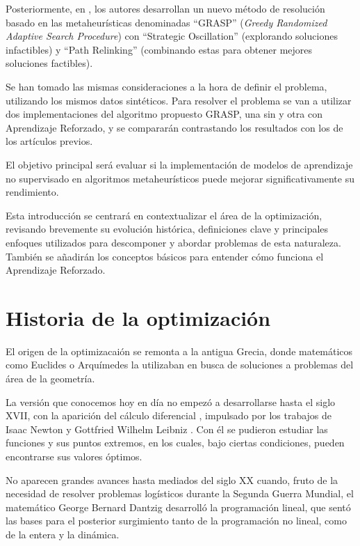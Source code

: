\documentclass[12pt,a4paper]{book}
\begin{document}
Posteriormente, en \cite{k-Balanced_2}, los autores desarrollan un nuevo método de resolución basado en las metaheurísticas denominadas ``GRASP'' \cite{GRASP} (\textit{Greedy Randomized Adaptive Search Procedure}) con ``Strategic Oscillation'' \cite{oscillation} (explorando soluciones infactibles) y ``Path Relinking'' \cite{path_relinking} (combinando estas para obtener mejores soluciones factibles).

Se han tomado las mismas consideraciones a la hora de definir el problema, utilizando los mismos datos sintéticos.
Para resolver el problema se van a utilizar dos implementaciones del algoritmo propuesto GRASP, una sin y otra con Aprendizaje Reforzado, y se compararán contrastando los resultados con los de los artículos previos.

El objetivo principal será evaluar si la implementación de modelos de aprendizaje no supervisado en algoritmos metaheurísticos puede mejorar significativamente su rendimiento.

Esta introducción se centrará en contextualizar el área de la optimización, revisando brevemente su evolución histórica, definiciones clave y principales enfoques utilizados para descomponer y abordar problemas de esta naturaleza. También se añadirán los conceptos básicos para entender cómo funciona el Aprendizaje Reforzado.


\section{Historia de la optimización}
El origen de la optimizacaión se remonta a la antigua Grecia, donde matemáticos como Euclides o Arquímedes la utilizaban en busca de soluciones a problemas del área de la geometría.

La versión que conocemos hoy en día no empezó a desarrollarse hasta el siglo XVII, con la aparición del cálculo diferencial \cite{calculo_diferencial}, impulsado por los trabajos de Isaac Newton y Gottfried Wilhelm Leibniz \cite{Leibniz}. Con él se pudieron estudiar las funciones y sus puntos extremos,
en los cuales, bajo ciertas condiciones, pueden encontrarse sus valores óptimos.

No aparecen grandes avances hasta mediados del siglo XX cuando, fruto de la necesidad de resolver problemas logísticos durante la Segunda Guerra Mundial, el matemático George Bernard Dantzig \cite{Dantzig} desarrolló la programación lineal, que sentó las bases para el posterior surgimiento tanto de la programación no lineal, como de la entera y la dinámica.
\end{document}
